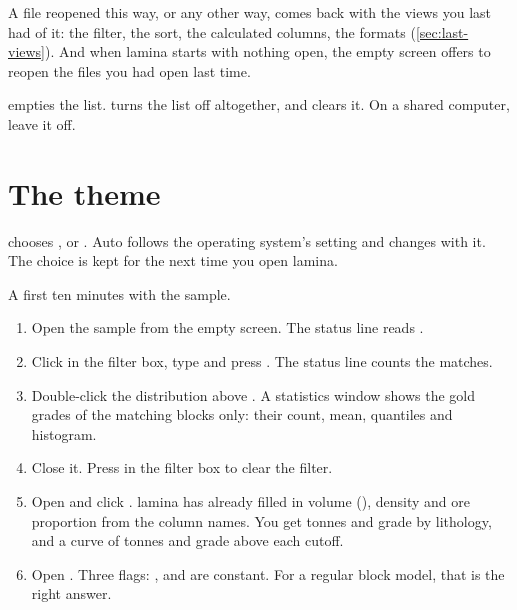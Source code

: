A file reopened this way, or any other way, comes back with the views you last had of it: the filter,
the sort, the calculated columns, the formats (\cref{sec:last-views}). And when lamina starts with nothing
open, the empty screen offers to reopen the files you had open last time.

 empties the list.  turns the list off
altogether, and clears it. On a shared computer, leave it off.

\section{The theme}

 chooses ,  or . Auto follows the operating
system's setting and changes with it. The choice is kept for the next time you open lamina.

\begin{tryit}
A first ten minutes with the sample.
\begin{enumerate}
\item Open the sample from the empty screen. The status line reads .
\item Click in the filter box, type  and press . The
status line counts the matches.
\item Double-click the distribution above . A statistics window shows the gold grades of
the matching blocks only: their count, mean, quantiles and histogram.
\item Close it. Press  in the filter box to clear the filter.
\item Open  and click . lamina has already filled in volume
(), density and ore proportion from the column names. You get tonnes and grade by
lithology, and a curve of tonnes and grade above each cutoff.
\item Open . Three flags: ,  and  are constant.
For a regular block model, that is the right answer.
\end{enumerate}
\end{tryit}
